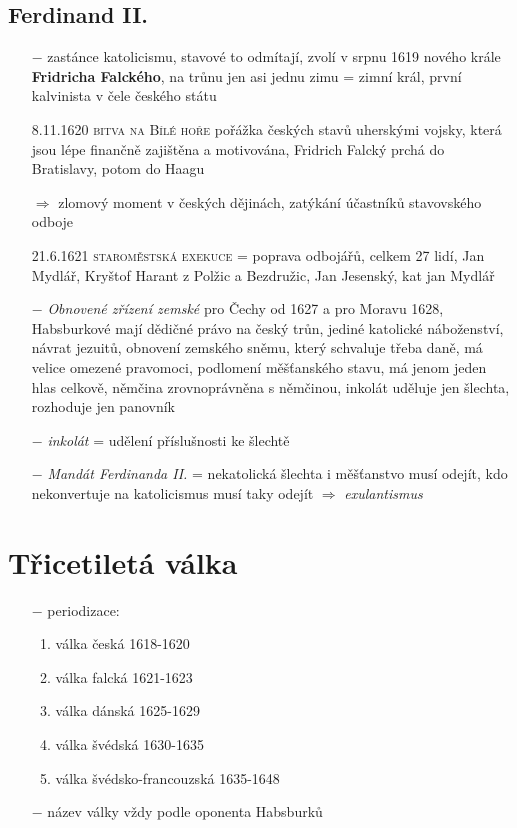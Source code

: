 \documentclass{article}
\begin{document}
\subsection*{Ferdinand II.}
\begin{itemize}
    \vspace{-0.5em}
    \setlength\itemsep{0.15em}
    \item[$-$] zastánce katolicismu, stavové to odmítají, zvolí v srpnu 1619 nového krále \textbf{Fridricha Falckého}, na trůnu jen asi jednu zimu = zimní král, první kalvinista v čele českého státu
    \item[8.11.1620] \textsc{bitva na Bílé hoře} pořážka českých stavů uherskými vojsky, která jsou lépe finančně zajištěna a motivována, Fridrich Falcký prchá do Bratislavy, potom do Haagu
    \item[$\Rightarrow$ ] zlomový moment v českých dějinách, zatýkání účastníků stavovského odboje
    \item[21.6.1621] \textsc{staroměstská exekuce} = poprava odbojářů, celkem 27 lidí, Jan Mydlář, Kryštof Harant z Polžic a Bezdružic,  Jan Jesenský, kat jan Mydlář
    \item[$-$] \textit{Obnovené zřízení zemské} pro Čechy od 1627 a pro Moravu 1628, Habsburkové mají dědičné právo na český trůn, jediné katolické náboženství, návrat jezuitů, obnovení zemského sněmu, který schvaluje třeba daně, má velice omezené pravomoci, podlomení měšťanského stavu, má jenom jeden hlas celkově, němčina zrovnoprávněna s němčinou, inkolát uděluje jen šlechta, rozhoduje jen panovník
    \item[$-$] \textit{inkolát} = udělení příslušnosti ke šlechtě
    \item[$-$] \textit{Mandát Ferdinanda II.} = nekatolická šlechta i měšťanstvo musí odejít, kdo nekonvertuje na katolicismus musí taky odejít $\Rightarrow$ \textit{exulantismus}

\end{itemize}

\section*{Třicetiletá válka}
\begin{itemize}
    \vspace{-0.5em}
    \setlength\itemsep{0.15em}
    \item[$-$] periodizace:
    \begin{enumerate}
        \vspace{-0.5em}
        \setlength\itemsep{0.15em}
        \item válka česká 1618-1620
        \item válka falcká 1621-1623
        \item válka dánská 1625-1629
        \item válka švédská 1630-1635
        \item válka švédsko-francouzská 1635-1648
    \end{enumerate}
    \item[$-$] název války vždy podle oponenta Habsburků

\end{itemize}
\end{document}
